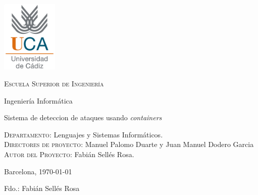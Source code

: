 \thispagestyle{empty}

\includegraphics[width=0.2\textwidth]{images/logouca}

\bigskip
\bigskip
\bigskip
  
  \begin{changemargin}{3em}{3em}

    \begin{center}
      {\Huge \textsc{\nohyphens{Escuela Superior de Ingeniería}}}
      
      \bigskip
      \bigskip
      
      {\huge \nohyphens{Ingeniería Informática}}
      
      \bigskip
      \bigskip
      \bigskip
      \bigskip
      
      {\LARGE \nohyphens{Sistema de deteccion de ataques usando  \emph{containers}}}
      
      \bigskip
      \bigskip
      \bigskip
      \bigskip
      
    \end{center}
  \end{changemargin}

  \begin{flushleft}
    \Large

    \textsc{Departamento}: \nohyphens{Lenguajes y Sistemas Informáticos.} \\
    \textsc{Directores de proyecto}: \nohyphens{Manuel Palomo Duarte y Juan Manuel Dodero Garcia} \\
    \textsc{Autor del Proyecto}: \nohyphens{Fabián Sellés Rosa}. \\
  \end{flushleft}
  
  \bigskip
  \bigskip
  \bigskip
  
  \begin{flushright}
    \large
    Barcelona, \today
    
    Fdo.: Fabián Sellés Rosa
    
  \end{flushright}

